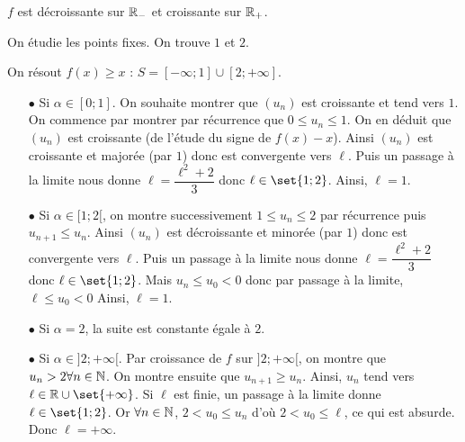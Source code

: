 \documentclass{magnolia}
\begin{document}
\begin{exos}
\begin{sol}
$f$ est décroissante sur $\mathbb{R}_-$ et croissante sur $\mathbb{R}_+$.

On étudie les points fixes. On trouve $1$ et $2$.

On résout $f(x)\geq x$ : $S=[-\infty;1]\cup [2;+\infty]$.

\begin{itemize}
\item[$\bullet$] Si $\alpha \in [0;1]$. On souhaite montrer que $(u_n)$ est croissante et tend vers $1$. 
On commence par montrer par récurrence que $0\leq u_n\leq 1$. On en déduit que $(u_n)$ est croissante (de l'étude du signe de $f(x)-x$). Ainsi $(u_n)$ est croissante et majorée (par $1$) donc est convergente vers $\ell$. Puis un passage à la limite nous donne $\ell=\dfrac{\ell^2+2}{3}$ donc $\ell \in \set{1;2}$. Ainsi, $\ell=1$.


\item[$\bullet$] Si $\alpha \in [1;2[$, on montre successivement $1\leq u_n\leq 2$ par récurrence puis $u_{n+1}\leq u_n$. Ainsi $(u_n)$ est décroissante et minorée (par $1$) donc est convergente vers $\ell$. Puis un passage à la limite nous donne $\ell=\dfrac{\ell^2+2}{3}$ donc $\ell \in \set{1;2}$. Mais $u_n\leq u_0<0$ donc par passage à la limite, $\ell\leq u_0<0$  Ainsi, $\ell=1$.

\item[$\bullet$] Si $\alpha=2$, la suite est constante égale à $2$.

\item[$\bullet$] Si $\alpha \in ]2;+\infty[$. Par croissance de $f$ sur $]2;+\infty[$, on montre que $u_n>2 \forall n \in \mathbb{N}$. On montre ensuite que $u_{n+1}\geq u_n$. Ainsi, $u_n$ tend vers $\ell \in \R\cup\set{+\infty}$. Si $\ell$ est finie, un passage à la limite donne $\ell \in \set{1;2}$. Or $\forall n \in \mathbb{N}$, $2<u_0\leq u_n$ d'où $2<u_0\leq \ell$, ce qui est absurde. Donc $\ell=+\infty$.


\end{itemize}
\end{sol}
\end{exos}
\end{document}

